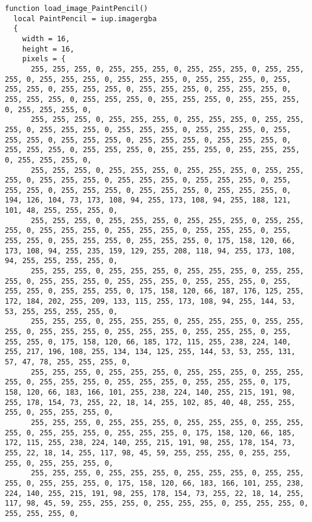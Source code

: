 \documentclass{ctexart}
\begin{document}
\begin{lstlisting}
function load_image_PaintPencil()
  local PaintPencil = iup.imagergba
  {
    width = 16,
    height = 16,
    pixels = {
      255, 255, 255, 0, 255, 255, 255, 0, 255, 255, 255, 0, 255, 255, 255, 0, 255, 255, 255, 0, 255, 255, 255, 0, 255, 255, 255, 0, 255, 255, 255, 0, 255, 255, 255, 0, 255, 255, 255, 0, 255, 255, 255, 0, 255, 255, 255, 0, 255, 255, 255, 0, 255, 255, 255, 0, 255, 255, 255, 0, 255, 255, 255, 0, 
      255, 255, 255, 0, 255, 255, 255, 0, 255, 255, 255, 0, 255, 255, 255, 0, 255, 255, 255, 0, 255, 255, 255, 0, 255, 255, 255, 0, 255, 255, 255, 0, 255, 255, 255, 0, 255, 255, 255, 0, 255, 255, 255, 0, 255, 255, 255, 0, 255, 255, 255, 0, 255, 255, 255, 0, 255, 255, 255, 0, 255, 255, 255, 0, 
      255, 255, 255, 0, 255, 255, 255, 0, 255, 255, 255, 0, 255, 255, 255, 0, 255, 255, 255, 0, 255, 255, 255, 0, 255, 255, 255, 0, 255, 255, 255, 0, 255, 255, 255, 0, 255, 255, 255, 0, 255, 255, 255, 0, 194, 126, 104, 73, 173, 108, 94, 255, 173, 108, 94, 255, 188, 121, 101, 48, 255, 255, 255, 0, 
      255, 255, 255, 0, 255, 255, 255, 0, 255, 255, 255, 0, 255, 255, 255, 0, 255, 255, 255, 0, 255, 255, 255, 0, 255, 255, 255, 0, 255, 255, 255, 0, 255, 255, 255, 0, 255, 255, 255, 0, 175, 158, 120, 66, 173, 108, 94, 255, 235, 159, 129, 255, 208, 118, 94, 255, 173, 108, 94, 255, 255, 255, 255, 0, 
      255, 255, 255, 0, 255, 255, 255, 0, 255, 255, 255, 0, 255, 255, 255, 0, 255, 255, 255, 0, 255, 255, 255, 0, 255, 255, 255, 0, 255, 255, 255, 0, 255, 255, 255, 0, 175, 158, 120, 66, 187, 176, 125, 255, 172, 184, 202, 255, 209, 133, 115, 255, 173, 108, 94, 255, 144, 53, 53, 255, 255, 255, 255, 0, 
      255, 255, 255, 0, 255, 255, 255, 0, 255, 255, 255, 0, 255, 255, 255, 0, 255, 255, 255, 0, 255, 255, 255, 0, 255, 255, 255, 0, 255, 255, 255, 0, 175, 158, 120, 66, 185, 172, 115, 255, 238, 224, 140, 255, 217, 196, 108, 255, 134, 134, 125, 255, 144, 53, 53, 255, 131, 57, 47, 78, 255, 255, 255, 0, 
      255, 255, 255, 0, 255, 255, 255, 0, 255, 255, 255, 0, 255, 255, 255, 0, 255, 255, 255, 0, 255, 255, 255, 0, 255, 255, 255, 0, 175, 158, 120, 66, 183, 166, 101, 255, 238, 224, 140, 255, 215, 191, 98, 255, 178, 154, 73, 255, 22, 18, 14, 255, 102, 85, 40, 48, 255, 255, 255, 0, 255, 255, 255, 0, 
      255, 255, 255, 0, 255, 255, 255, 0, 255, 255, 255, 0, 255, 255, 255, 0, 255, 255, 255, 0, 255, 255, 255, 0, 175, 158, 120, 66, 185, 172, 115, 255, 238, 224, 140, 255, 215, 191, 98, 255, 178, 154, 73, 255, 22, 18, 14, 255, 117, 98, 45, 59, 255, 255, 255, 0, 255, 255, 255, 0, 255, 255, 255, 0, 
      255, 255, 255, 0, 255, 255, 255, 0, 255, 255, 255, 0, 255, 255, 255, 0, 255, 255, 255, 0, 175, 158, 120, 66, 183, 166, 101, 255, 238, 224, 140, 255, 215, 191, 98, 255, 178, 154, 73, 255, 22, 18, 14, 255, 117, 98, 45, 59, 255, 255, 255, 0, 255, 255, 255, 0, 255, 255, 255, 0, 255, 255, 255, 0, 

\end{lstlisting}
\end{document}
